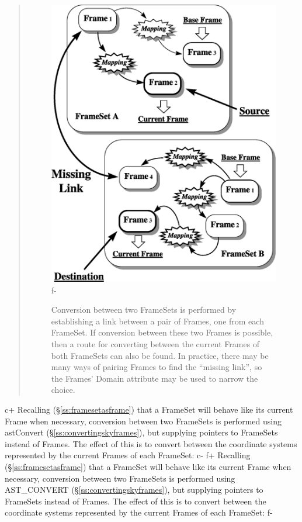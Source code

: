 \documentclass[twoside,11pt]{article}
\newcommand{\secref}[1]{\S\ref{#1}}
\newcommand{\secref}[1]{\ref{#1}}
\begin{document}
\begin{htmlonly}
\begin{quote}
\begin{figure}
   \includegraphics[scale=1.0]{sun210_figures/fsalign.eps}
f-
   \caption{Conversion between two FrameSets is performed by establishing
   a link between a pair of Frames, one from each FrameSet. If conversion
   between these two Frames is possible, then a route for converting
   between the current Frames of both FrameSets can also be found. In
   practice, there may be many ways of pairing Frames to find the
   ``missing link'', so the Frames' Domain attribute may be used to
   narrow the choice.}
   \end{figure}
   \end{quote}
\end{htmlonly}
c+
Recalling (\secref{ss:framesetasframe}) that a FrameSet will behave
like its current Frame when necessary, conversion between two
FrameSets is performed using astConvert
(\secref{ss:convertingskyframes}), but supplying pointers to FrameSets
instead of Frames. The effect of this is to convert between the
coordinate systems represented by the current Frames of each FrameSet:
c-
f+
Recalling (\secref{ss:framesetasframe}) that a FrameSet will behave
like its current Frame when necessary, conversion between two
FrameSets is performed using AST\_CONVERT
(\secref{ss:convertingskyframes}), but supplying pointers to FrameSets
instead of Frames. The effect of this is to convert between the
coordinate systems represented by the current Frames of each FrameSet:
f-
\end{document}

